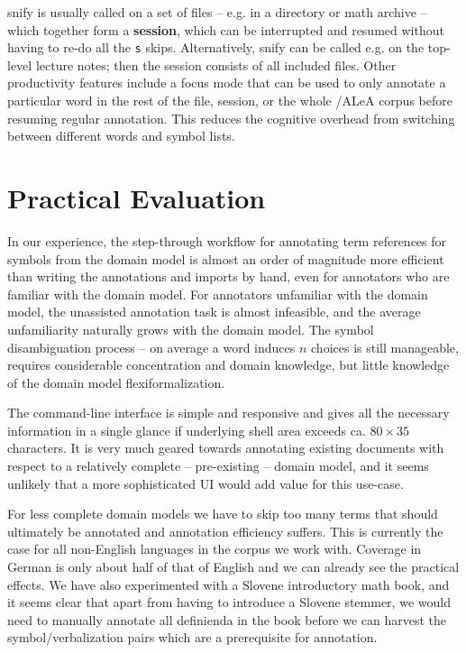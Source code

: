 \documentclass{llncs}
\newcommand\ALeA{\textsf{ALeA}\xspace}
\newcommand\snify{\textsf{snify}\xspace}
\begin{document}
\snify is usually called on a set of files -- e.g. in a directory or math archive -- which
together form a \textbf{session}, which can be interrupted and resumed without having to
re-do all the \lstinline|s| skips. Alternatively, \snify can be called e.g. on the top-level
lecture notes; then the session consists of all included files. Other productivity
features include a focus mode that can be used to only annotate a particular word in the
rest of the file, session, or the whole \sTeX/\ALeA corpus before resuming regular
annotation. This reduces the cognitive overhead from switching between different 
words and symbol lists.

\section{Practical Evaluation}

In our experience, the step-through workflow for annotating term references for symbols
from the domain model is almost an order of magnitude more efficient than writing the
annotations and imports by hand, even for annotators who are familiar with the domain
model. For annotators unfamiliar with the domain model, the unassisted annotation task is
almost infeasible, and the average unfamiliarity naturally grows with the domain
model. The symbol disambiguation process -- on average a word induces $n$ choices is still manageable,
requires considerable concentration and domain knowledge, but little knowledge of the
domain model flexiformalization.

The command-line interface is simple and responsive and gives all the necessary
information in a single glance if underlying shell area exceeds ca. $80\times 35$
characters. It is very much geared towards annotating existing documents with respect to a
relatively complete -- pre-existing -- domain model, and it seems unlikely that a more
sophisticated UI would add value for this use-case.

For less complete domain models we have to skip too many terms that should ultimately be
annotated and annotation efficiency suffers. This is currently the case for all
non-English languages in the \sTeX corpus we work with. Coverage in German is only about
half of that of English and we can already see the practical effects. We have also
experimented with a Slovene introductory math book, and it seems clear that apart from
having to introduce a Slovene stemmer, we would need to manually annotate all
definienda in the book before we can harvest the symbol/verbalization pairs which are a
prerequisite for annotation.
\end{document}
